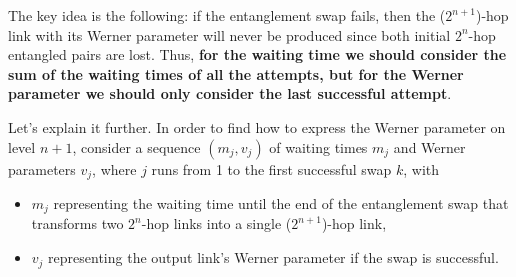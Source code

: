 \documentclass{masterthesis}
\begin{document}





The key idea 
is the following: if the entanglement swap fails, then the ($2^{n+1}$)-hop link with its Werner parameter will never be produced since both initial $2^{n}$-hop entangled pairs are lost. Thus, \textbf{for the waiting time we should consider the sum of the waiting times of all the attempts, but for the Werner parameter we should only consider the last successful attempt}.

Let's explain it further.
In order to find how to express the Werner parameter on level $n+1$, consider a sequence $\left(m_{j}, v_{j}\right)$ of waiting times $m_{j}$ and Werner parameters $v_{j}$, where $j$ runs from 1 to the first successful swap $k$, with
\begin{itemize}
    \item $m_{j}$ representing the waiting time until the end of the entanglement swap that transforms two $2^{n}$-hop links into a single ($2^{n+1}$)-hop link,
    \item $v_{j}$ representing the output link's Werner parameter if the swap is successful. 
\end{itemize}
\end{document}
